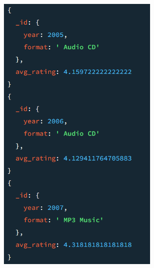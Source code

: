 \begin{figure}[H]
  \centering
  \begin{minipage}{0.45\textwidth}
      \centering
      \includegraphics[width=0.7\textwidth]{Images/q10_result_1.png}
  \end{minipage}\hfill
  \begin{minipage}{0.45\textwidth}
      \centering

\end{minipage}
\end{figure}
